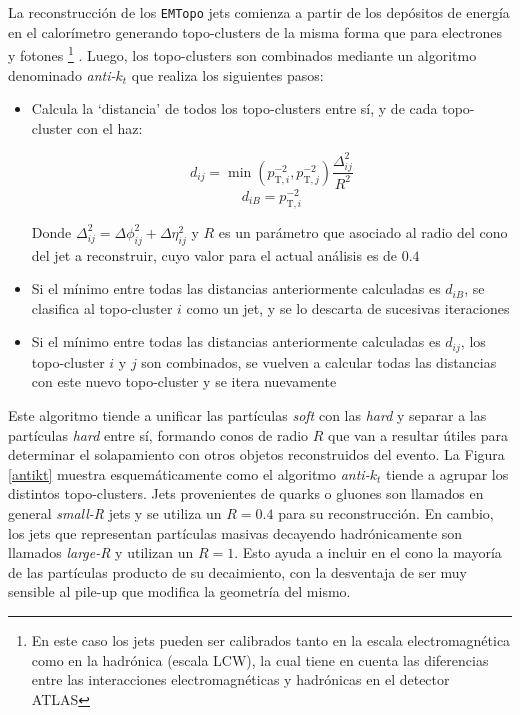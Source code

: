 La reconstrucción de los \texttt{EMTopo} jets comienza a partir de los depósitos de energía en el calorímetro generando topo-clusters de la misma forma que para electrones y fotones \footnote{En este caso los jets pueden ser calibrados tanto en la escala electromagnética como en la hadrónica (escala LCW), la cual tiene en cuenta las diferencias entre las interacciones electromagnéticas y hadrónicas en el detector ATLAS} \cite{Lampl:1099735}. Luego, los topo-clusters son combinados mediante un algoritmo denominado \textit{anti-$k_t$} \cite{Cacciari:2008gp} que realiza los siguientes pasos:

\begin{itemize}
	\item Calcula la `distancia' de todos los topo-clusters entre sí, y de cada topo-cluster con el haz:

	\begin{equation}
		d_{ij} = \min(p_{\text{T},i}^{-2}, p_{\text{T},j}^{-2})\frac{\Delta_{ij}^{2}}{R^{2}}
	\end{equation}
	\begin{equation}
		d_{iB} = p_{\text{T},i}^{-2}
	\end{equation}

	Donde $\Delta_{ij}^{2} = \Delta\phi_{ij}^{2} + \Delta\eta_{ij}^{2}$ y $R$ es un parámetro que asociado al radio del cono del jet a reconstruir, cuyo valor para el actual análisis es de $0.4$

	\item Si el mínimo entre todas las distancias anteriormente calculadas es $d_{iB}$, se clasifica al topo-cluster $i$ como un jet, y se lo descarta de sucesivas iteraciones

	\item Si el mínimo entre todas las distancias anteriormente calculadas es $d_{ij}$, los topo-cluster $i$ y $j$ son combinados, se vuelven a calcular todas las distancias con este nuevo topo-cluster y se itera nuevamente 

\end{itemize}

Este algoritmo tiende a unificar las partículas \textit{soft} con las \textit{hard} y separar a las partículas \textit{hard} entre sí, formando conos de radio $R$ que van a resultar útiles para determinar el solapamiento con otros objetos reconstruidos del evento. La Figura \ref{antikt} muestra esquemáticamente como el algoritmo \textit{anti-$k_t$} tiende a agrupar los distintos topo-clusters. Jets provenientes de quarks o gluones son llamados en general \textit{small-R} jets y se utiliza un $R=0.4$ para su reconstrucción. En cambio, los jets que representan partículas masivas decayendo hadrónicamente son llamados \textit{large-R} y utilizan un $R=1$. Esto ayuda a incluir en el cono la mayoría de las partículas producto de su decaimiento, con la desventaja de ser muy sensible al pile-up que modifica la geometría del mismo.

